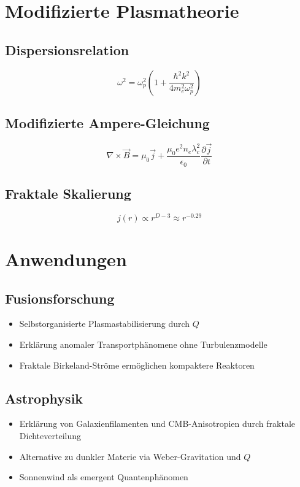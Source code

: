 \documentclass[10pt, a4paper]{article}
\begin{document}
\section*{Modifizierte Plasmatheorie}

\subsection*{Dispersionsrelation}
\[
\omega^2 = \omega_p^2 \left(1 + \frac{\hbar^2 k^2}{4m_e^2 \omega_p^2} \right)
\]

\subsection*{Modifizierte Ampere-Gleichung}
\[
\nabla \times \vec{B} = \mu_0 \vec{j} + \frac{\mu_0 e^2 n_e \lambda_c^2}{\epsilon_0} \frac{\partial \vec{j}}{\partial t}
\]

\subsection*{Fraktale Skalierung}
\[
j(r) \propto r^{D-3} \approx r^{-0.29}
\]

\section*{Anwendungen}

\subsection*{Fusionsforschung}
\begin{itemize}
    \item Selbstorganisierte Plasmastabilisierung durch $Q$
    \item Erklärung anomaler Transportphänomene ohne Turbulenzmodelle
    \item Fraktale Birkeland-Ströme ermöglichen kompaktere Reaktoren
\end{itemize}

\subsection*{Astrophysik}
\begin{itemize}
    \item Erklärung von Galaxienfilamenten und CMB-Anisotropien durch fraktale Dichteverteilung
    \item Alternative zu dunkler Materie via Weber-Gravitation und $Q$
    \item Sonnenwind als emergent Quantenphänomen
\end{itemize}
\end{document}
